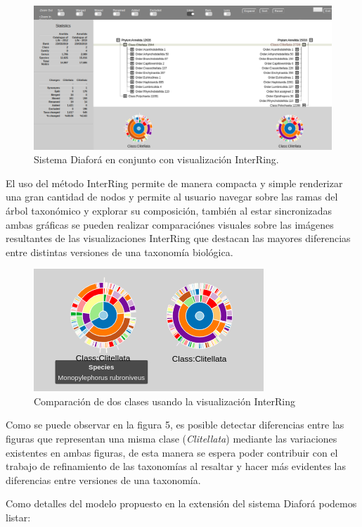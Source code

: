 \documentclass[journal]{IEEEtran}
\begin{document}
\begin{figure}[]
  \centering
  \includegraphics[scale=0.25]{extend_diafora.png}
  \caption{Sistema Diaforá en conjunto con visualización InterRing.}
  \label{}
\end{figure}

El uso del método InterRing permite de manera compacta y simple renderizar una gran cantidad de nodos y permite al usuario navegar sobre las ramas 
del árbol taxonómico y explorar su composición, también al estar sincronizadas ambas gráficas se pueden realizar comparaciónes 
visuales sobre las imágenes resultantes de las visualizaciones InterRing que destacan las mayores diferencias entre distintas versiones de una taxonomía biológica.

\begin{figure}
  \centering
  \includegraphics[]{interringCompare.png}
  \caption{Comparación de dos clases usando la visualización InterRing}
  \label{}
\end{figure}

Como se puede observar en la figura 5, es posible detectar diferencias entre las figuras que representan una misma clase (\emph{Clitellata})
mediante las variaciones existentes en ambas figuras, de esta manera se espera poder contribuir con el trabajo de refinamiento de las taxonomías al 
resaltar y hacer más evidentes las diferencias entre versiones de una taxonomía.

Como detalles del modelo propuesto en la extensión del sistema Diaforá podemos listar:
\end{document}
